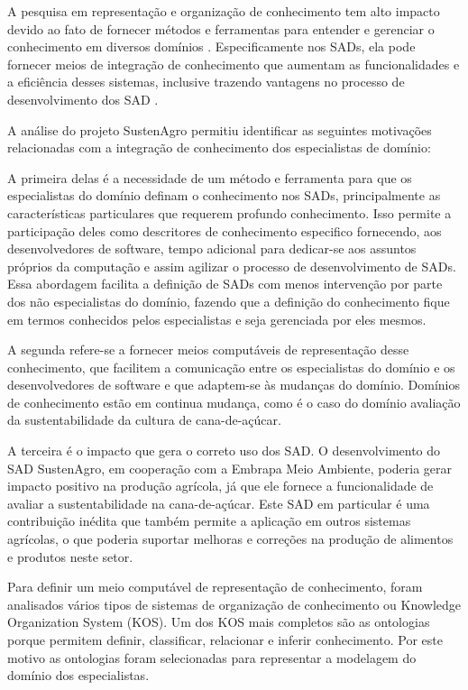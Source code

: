 A pesquisa em representação e organização de conhecimento tem alto
impacto devido ao fato de fornecer métodos e ferramentas para entender
e gerenciar o conhecimento em diversos domínios \citep{Tudhope2006}.
Especificamente nos SADs, ela pode fornecer meios de integração de
conhecimento que aumentam as funcionalidades e a eficiência desses
sistemas, inclusive trazendo vantagens no processo de desenvolvimento
dos SAD \citep{Saxena}.

A análise do projeto SustenAgro permitiu identificar as seguintes
motivações relacionadas com a integração de conhecimento dos especialistas
de domínio:

A primeira delas é a necessidade de um método e ferramenta para que
os especialistas do domínio definam o conhecimento nos SADs, principalmente
as características particulares que requerem profundo conhecimento.
Isso permite a participação deles como descritores de conhecimento
especifico fornecendo, aos desenvolvedores de software, tempo adicional
para dedicar-se aos assuntos próprios da computação e assim agilizar
o processo de desenvolvimento de SADs. Essa abordagem facilita a definição
de SADs com menos intervenção por parte dos não especialistas do domínio,
fazendo que a definição do conhecimento fique em termos conhecidos
pelos especialistas e seja gerenciada por eles mesmos. 

A segunda refere-se a fornecer meios computáveis de representação
desse conhecimento, que facilitem a comunicação entre os especialistas
do domínio e os desenvolvedores de software e que adaptem-se às mudanças
do domínio. Domínios de conhecimento estão em continua mudança, como
é o caso do domínio avaliação da sustentabilidade da cultura de cana-de-açúcar\citep{oliveira:2013}. 

A terceira é o impacto que gera o correto uso dos SAD\citep{Lee2008349}.
O desenvolvimento do SAD SustenAgro, em cooperação com a Embrapa Meio
Ambiente, poderia gerar impacto positivo na produção agrícola, já
que ele fornece a funcionalidade de avaliar a sustentabilidade na
cana-de-açúcar. Este SAD em particular é uma contribuição inédita
que também permite a aplicação em outros sistemas agrícolas, o que
poderia suportar melhoras e correções na produção de alimentos e produtos
neste setor\citep{Matthews2008149}.

Para definir um meio computável de representação de conhecimento,
foram analisados vários tipos de sistemas de organização de conhecimento
ou \foreignlanguage{english}{Knowledge Organization System} (\foreignlanguage{english}{KOS}).
Um dos \foreignlanguage{english}{KOS} mais completos são as ontologias
porque permitem definir, classificar, relacionar e inferir conhecimento.
Por este motivo as ontologias foram selecionadas para representar
a modelagem do domínio dos especialistas.

